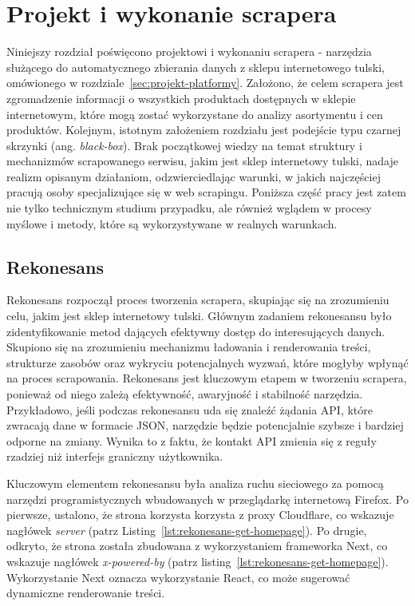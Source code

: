 \newpage


\section{Projekt i wykonanie scrapera}\label{sec:projekt-scrapera}

Niniejszy rozdział poświęcono projektowi i wykonaniu scrapera - narzędzia służącego do automatycznego zbierania danych z sklepu internetowego tulski, omówionego w rozdziale~\ref{sec:projekt-platformy}.
Założono, że celem scrapera jest zgromadzenie informacji o wszystkich produktach dostępnych w sklepie internetowym, które mogą zostać wykorzystane do analizy asortymentu i cen produktów.
Kolejnym, istotnym założeniem rozdziału jest podejście typu czarnej skrzynki (ang. \emph{black-box})\cite{sekurak-testy-penetracyjne}.
Brak początkowej wiedzy na temat struktury i mechanizmów scrapowanego serwisu, jakim jest sklep internetowy tulski, nadaje realizm opisanym działaniom, odzwierciedlając warunki, w jakich najczęściej pracują osoby specjalizujące się w web scrapingu.
Poniższa część pracy jest zatem nie tylko technicznym studium przypadku, ale również wglądem w procesy myślowe i metody, które są wykorzystywane w realnych warunkach.

\subsection{Rekonesans}\label{subsec:rekonesans}

Rekonesans rozpoczął proces tworzenia scrapera, skupiając się na zrozumieniu celu, jakim jest sklep internetowy tulski.
Głównym zadaniem rekonesansu było zidentyfikowanie metod dających efektywny dostęp do interesujących danych.
Skupiono się na zrozumieniu mechanizmu ładowania i renderowania treści, strukturze zasobów oraz wykryciu potencjalnych wyzwań, które mogłyby wpłynąć na proces scrapowania.
Rekonesans jest kluczowym etapem w tworzeniu scrapera, ponieważ od niego zależą efektywność, awaryjność i stabilność narzędzia.
Przykładowo, jeśli podczas rekonesansu uda się znaleźć żądania API, które zwracają dane w formacie JSON, narzędzie będzie potencjalnie szybsze i bardziej odporne na zmiany.
Wynika to z faktu, że kontakt API zmienia się z reguły rzadziej niż interfejs graniczny użytkownika.

Kluczowym elementem rekonesansu była analiza ruchu sieciowego za pomocą narzędzi programistycznych wbudowanych w przeglądarkę internetową Firefox.
Po pierwsze, ustalono, że strona korzysta korzysta z proxy Cloudflare, co wskazuje nagłówek \emph{server} (patrz Listing~\ref{lst:rekonesans-get-homepage}).
Po drugie, odkryto, że strona została zbudowana z wykorzystaniem frameworka Next, co wskazuje nagłówek \emph{x-powered-by} (patrz listing~\ref{lst:rekonesans-get-homepage}).
Wykorzystanie Next oznacza wykorzystanie React, co może sugerować dynamiczne renderowanie treści.

